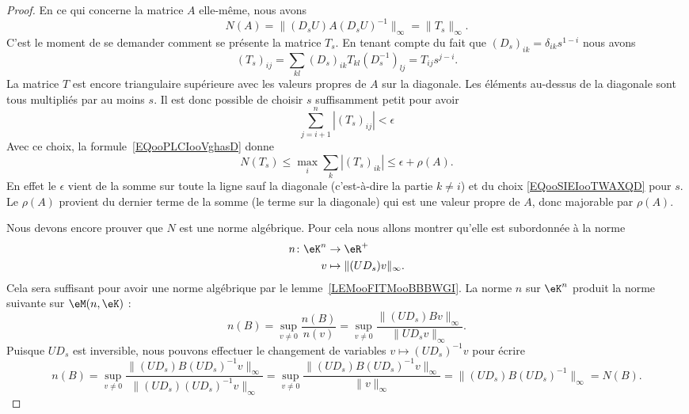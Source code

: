 \begin{proof}
	En ce qui concerne la matrice \( A\) elle-même, nous avons
	\begin{equation}
		N(A)=\| (D_sU)A(D_sU)^{-1} \|_{\infty}=\| T_s \|_{\infty}.
	\end{equation}
	C'est le moment de se demander comment se présente la matrice \( T_s\). En tenant compte du fait que \( (D_s)_{ik}=\delta_{ik}s^{1-i}\) nous avons
	\begin{equation}
		(T_s)_{ij}=\sum_{kl}(D_s)_{ik}T_{kl}(D^{-1}_s)_{lj}=T_{ij}s^{j-i}.
	\end{equation}
	La matrice \( T\) est encore triangulaire supérieure avec les valeurs propres de \( A\) sur la diagonale. Les éléments au-dessus de la diagonale sont tous multipliés par au moins \( s\). Il est donc possible de choisir \( s\) suffisamment petit pour avoir
	\begin{equation}        \label{EQooSIEIooTWAXQD}
		\sum_{j=i+1}^n| (T_s)_{ij} |<\epsilon
	\end{equation}
	Avec ce choix, la formule~\ref{EQooPLCIooVghasD} donne
	\begin{equation}
		N(T_s)\leq\max_i\sum_k| (T_s)_{ik} |\leq \epsilon+\rho(A).
	\end{equation}
	En effet le \( \epsilon\) vient de la somme sur toute la ligne sauf la diagonale (c'est-à-dire la partie \( k\neq i\)) et du choix \eqref{EQooSIEIooTWAXQD} pour \( s\). Le \( \rho(A)\) provient du dernier terme de la somme (le terme sur la diagonale) qui est une valeur propre de \( A\), donc majorable par \( \rho(A)\).

	Nous devons encore prouver que \( N\) est une norme algébrique. Pour cela nous allons montrer qu'elle est subordonnée à la norme
	\begin{equation}
		\begin{aligned}
			n\colon \eK^n & \to \eR^+                       \\
			v             & \mapsto \| (UD_s)v \|_{\infty}.
		\end{aligned}
	\end{equation}
	Cela sera suffisant pour avoir une norme algébrique par le lemme~\ref{LEMooFITMooBBBWGI}. La norme \( n\) sur \( \eK^n\) produit la norme suivante sur \( \eM(n,\eK)\) :
	\begin{equation}
		n(B)=\sup_{v\neq 0}\frac{ n(B) }{ n(v) }=\sup_{v\neq 0}\frac{ \| (UD_s)Bv \|_{\infty} }{ \| UD_sv \|_{\infty} }.
	\end{equation}
	Puisque \( UD_s\) est inversible, nous pouvons effectuer le changement de variables \( v\mapsto (UD_s)^{-1} v\) pour écrire
	\begin{equation}
		n(B)=\sup_{v\neq 0}  \frac{  \| (UD_s)B(UD_s)^{-1}v \|_{\infty} }{ \| (UD_s)(UD_s)^{-1}v \|_{\infty} }=\sup_{v\neq 0}\frac{  \| (UD_s)B(UD_s)^{-1}v \|_{\infty} }{ \| v \|_{\infty} }=\| (UD_s)B(UD_s)^{-1} \|_{\infty}=N(B).
	\end{equation}
\end{proof}

